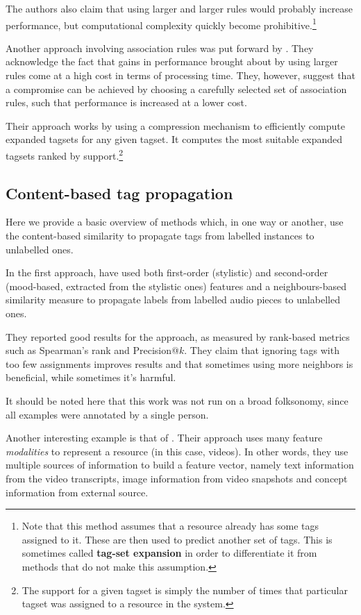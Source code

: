 The authors also claim that using larger and larger rules would probably increase performance, but computational complexity quickly become prohibitive.\footnote{Note that this method assumes that a resource already has some tags assigned to it. These are then used to predict another set of tags. This is sometimes called \textbf{tag-set expansion} in order to differentiate it from methods that do not make this assumption.}

Another approach involving association rules was put forward by \cite{vanleeuwen_puspitaningrum_2012}. They acknowledge the fact that gains in performance brought about by using larger rules come at a high cost in terms of processing time. They, however, suggest that a compromise can be achieved by choosing a carefully selected set of association rules, such that performance is increased at a lower cost.

Their approach works by using a compression mechanism to efficiently compute expanded tagsets for any given tagset. It computes the most suitable expanded tagsets ranked by support.\footnote{The support for a given tagset is simply the number of times that particular tagset was assigned to a resource in the system.}

\subsection{Content-based tag propagation}

Here we provide a basic overview of methods which, in one way or another, use the content-based similarity to propagate tags from labelled instances to unlabelled ones.

In the first approach, \cite{sordo_etal_2007} have used both first-order (stylistic) and second-order (mood-based, extracted from the stylistic ones) features and a neighbours-based similarity measure to propagate labels from labelled audio pieces to unlabelled ones.

They reported good results for the approach, as measured by rank-based metrics such as Spearman's rank and Precision@$k$. They claim that ignoring tags with too few assignments improves results and that sometimes using more neighbors is beneficial, while sometimes it's harmful.

It should be noted here that this work was not run on a broad folksonomy, since all examples were annotated by a single person.

Another interesting example is that of \cite{moxley_etal_2008}. Their approach uses many feature \textit{modalities} to represent a resource (in this case, videos). In other words, they use multiple sources of information to build a feature vector, namely text information from the video transcripts, image information from video snapshots and concept information from external source.

